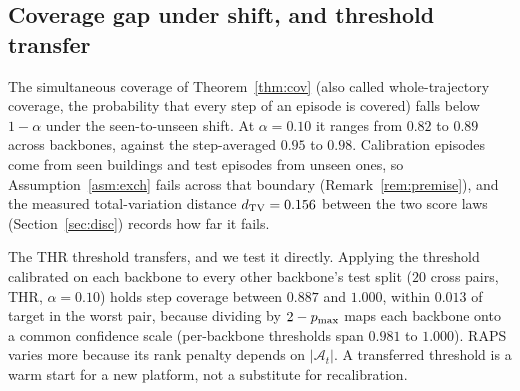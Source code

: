 \subsection{Coverage gap under shift, and threshold transfer}
\label{ssec:gap}
The simultaneous coverage of Theorem~\ref{thm:cov} (also called
whole-trajectory coverage, the probability that every step of an episode is
covered) falls below $1-\alpha$ under the seen-to-unseen shift. At
$\alpha = 0.10$ it ranges from $0.82$ to $0.89$ across backbones, against the
step-averaged $0.95$ to $0.98$. Calibration episodes come from seen
buildings and test episodes from unseen ones, so Assumption~\ref{asm:exch}
fails across that boundary (Remark~\ref{rem:premise}), and the measured
total-variation distance $d_{\mathrm{TV}} = 0.156$ between the two score laws
(Section~\ref{sec:disc}) records how far it fails.

The THR threshold transfers, and we test it directly.
Applying the threshold calibrated on each backbone to
every other backbone's test split ($20$ cross pairs, THR, $\alpha=0.10$)
holds step coverage between $0.887$ and $1.000$, within $0.013$ of target in
the worst pair, because dividing by $2-p_{\max}$ maps each backbone onto a
common confidence scale (per-backbone thresholds span $0.981$ to $1.000$).
RAPS varies more because its rank penalty depends on $|\mathcal{A}_t|$. A
transferred threshold is a warm start for a new platform, not a substitute
for recalibration.
